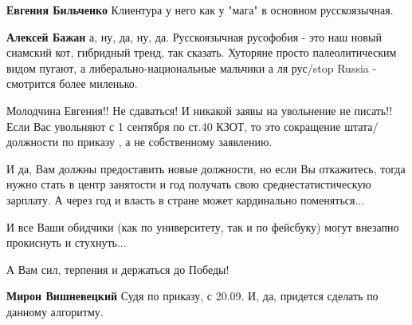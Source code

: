 \begin{itemize}
\begin{itemize}
\textbf{Евгения Бильченко} Клиентура у него как у "мага" в основном русскоязычная.

 
\textbf{Алексей Бажан} а, ну, да, ну, да. Русскоязычная русофобия - это наш новый сиамский кот, гибридный тренд, так сказать. Хуторяне просто палеолитическим видом пугают, а либерально-национальные мальчики а ля рус/stop Russia - смотрится более миленько.

\end{itemize}

 

Молодчина Евгения!! Не сдаваться! И никакой заявы на увольнение не писать!!
Если Вас увольняют с 1 сентября по ст.40 КЗОТ, то это сокращение
штата/должности по приказу , а не собственному заявлению.

И да, Вам должны предоставить новые должности, но если Вы откажитесь, тогда
нужно стать в центр занятости и год получать свою среднестатистическую
зарплату. А через год и власть в стране может кардинально поменяться...

И все Ваши обидчики (как по университету, так и по фейсбуку) могут внезапно
прокиснуть и стухнуть...

А Вам сил, терпения и держаться до Победы!

\begin{itemize}
 
\textbf{Мирон Вишневецкий} Судя по приказу, с 20.09. И, да, придется сделать по данному алгоритму.
\end{itemize}

 


\end{itemize}
